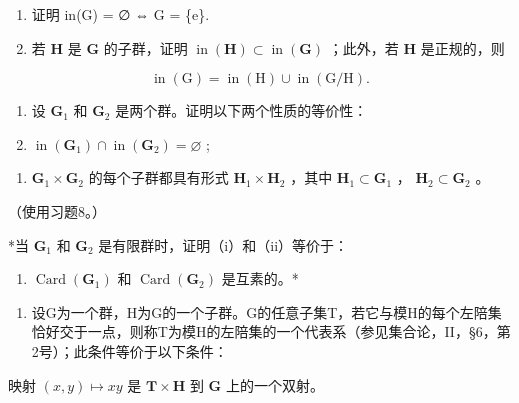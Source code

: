 \begin{enumerate}
\def\labelenumi{(\alph{enumi})}
\item
  证明 in(G) = ∅ ⇔ G = \{e\}.
\item
  若 \(\mathbf{H}\) 是 \(\mathbf{G}\) 的子群，证明 \(\operatorname{in}(\mathbf{H}) \subset \operatorname{in}(\mathbf{G})\) ；此外，若 \(\mathbf{H}\) 是正规的，则
\end{enumerate}

\[
\operatorname{in} (\mathrm{G}) = \operatorname{in} (\mathrm{H}) \cup \operatorname{in} (\mathrm{G} / \mathrm{H}).
\]

\begin{enumerate}
\def\labelenumi{(\alph{enumi})}
\setcounter{enumi}{2}
\item
  设 \(\mathbf{G}_1\) 和 \(\mathbf{G}_2\) 是两个群。证明以下两个性质的等价性：
\item
  \(\operatorname{in}(\mathbf{G}_1) \cap \operatorname{in}(\mathbf{G}_2) = \varnothing\) ;
\end{enumerate}

\begin{enumerate}
\def\labelenumi{(\roman{enumi})}
\setcounter{enumi}{1}
\tightlist
\item
  \(\mathbf{G}_1\times \mathbf{G}_2\) 的每个子群都具有形式 \(\mathbf{H}_1\times \mathbf{H}_2\) ，其中 \(\mathbf{H}_1\subset \mathbf{G}_1\) ， \(\mathbf{H}_2\subset \mathbf{G}_2\) 。
\end{enumerate}

（使用习题8。）

*当 \(\mathbf{G}_1\) 和 \(\mathbf{G}_2\) 是有限群时，证明（i）和（ii）等价于：

\begin{enumerate}
\def\labelenumi{(\roman{enumi})}
\setcounter{enumi}{2}
\tightlist
\item
  \(\operatorname{Card}(\mathbf{G}_1)\) 和 \(\operatorname{Card}(\mathbf{G}_2)\) 是互素的。*
\end{enumerate}

\begin{enumerate}
\def\labelenumi{\arabic{enumi}.}
\setcounter{enumi}{13}
\tightlist
\item
  设G为一个群，H为G的一个子群。G的任意子集T，若它与模H的每个左陪集恰好交于一点，则称T为模H的左陪集的一个代表系（参见集合论，II，§6，第2号）；此条件等价于以下条件：
\end{enumerate}

映射 \((x,y)\mapsto xy\) 是 \(\mathbf{T}\times \mathbf{H}\) 到 \(\mathbf{G}\) 上的一个双射。

